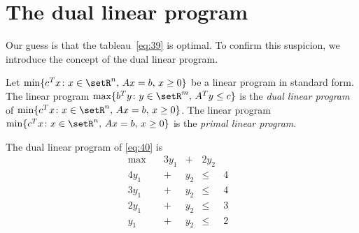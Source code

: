 

\section{The dual linear program}
\label{sec:dual-linear-program}

Our guess is that the tableau~\eqref{eq:39} is optimal. To confirm
this suspicion, we introduce the concept of the dual
linear program. 

\begin{definition}
  \label{def:15}
  Let $\min\{c^Tx \colon x \in \setR^n, \, Ax=b, \, x\geq0\}$ be a linear
  program in standard form. The linear program $\max\{ b^Ty \colon y \in
  \setR^m, \,A^Ty \leq  c\}$ is  the \emph{dual linear program} of
  $\min\{c^Tx \colon x \in \setR^n, \, Ax=b, \, x\geq0\}$.  The linear program
   $\min\{c^Tx \colon x \in \setR^n, \, Ax=b, \, x\geq0\}$ is  the
  \emph{primal linear program}.  
\end{definition}

\begin{example}
  \label{sec:dual-linear-program-1}
  The dual linear program of \eqref{eq:40} is 
  \begin{equation}
    \label{eq:41}
    \begin{matrix}
      \max \quad &  3 y_1 & + & 2 y_2 & & \\
      4 y_1 & + & y_2 & \leq & 4 \\
      3 y_1 & + & y_2 & \leq & 4\\
      2 y_1 & + & y_2 & \leq & 3\\
      y_1 & +& y_2 & \leq & 2
    \end{matrix}
  \end{equation}
\end{example}

